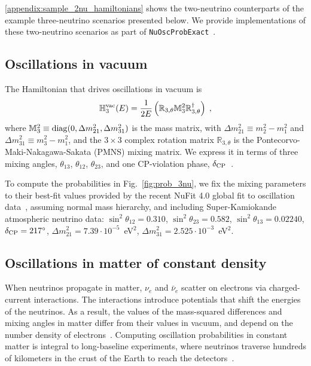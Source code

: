 \documentclass[final,5p,times,twocolumn]{elsarticle}
\newcommand{\fig}{Fig.}
\newcommand{\figu}[1]{\fig~\ref{fig:#1}}
\begin{document}
\ref{appendix:sample_2nu_hamiltonians} shows the two-neutrino counterparts of the example three-neutrino scenarios presented below.  We provide implementations of these two-neutrino scenarios as part of {\tt NuOscProbExact}\ \cite{NuOscProbExact}.  


\subsection{Oscillations in vacuum}

The Hamiltonian that drives oscillations in vacuum is
\begin{equation}
 \label{equ:h3_vacuum}
 \mathbb{H}_3^{\rm vac}(E)
 = 
 \frac{1}{2E} \left( \mathbb{R}_{3,\theta} \mathbb{M}_3^2 \mathbb{R}_{3,\theta}^\dagger \right) \;,
\end{equation}
where $\mathbb{M}_3^2 \equiv {\rm diag}(0, \Delta m_{21}^2, \Delta m_{31}^2)$ is the mass matrix, with $\Delta m_{21}^2 \equiv m_2^2-m_1^2$ and $\Delta m_{31}^2 \equiv m_3^2-m_1^2$, and the $3 \times 3$ complex rotation matrix $\mathbb{R}_{3,\theta}$ is the Pontecorvo-Maki-Nakagawa-Sakata (PMNS) mixing matrix.  We express it in terms of three mixing angles, $\theta_{13}$, $\theta_{12}$, $\theta_{23}$, and one CP-violation phase, $\delta_{\rm CP}$\ \cite{Tanabashi:2018oca}.  

To compute the probabilities in \figu{prob_3nu}, we fix the mixing parameters to their best-fit values provided by the recent NuFit 4.0 global fit to oscillation data\ \cite{Esteban:2018azc, NuFit4.0}, assuming normal mass hierarchy, and including Super-Kamiokande atmospheric neutrino data: $\sin^2 \theta_{12} = 0.310$, $\sin^2 \theta_{23} = 0.582$, $\sin^2 \theta_{13} = 0.02240$, $\delta_{\rm CP} = 217^\circ$, $\Delta m_{21}^2 = 7.39 \cdot 10^{-5}$~eV$^2$, $\Delta m_{31}^2 = 2.525 \cdot 10^{-3}$~eV$^2$.


\subsection{Oscillations in matter of constant density}
\label{section:prob_3nu_matter}

When neutrinos propagate in matter, $\nu_e$ and $\bar{\nu}_e$ scatter on electrons via charged-current interactions.  The interactions introduce potentials that shift the energies of the neutrinos.  As a result, the values of the mass-squared differences and mixing angles in matter differ from their values in vacuum, and depend on the number density of electrons\ \cite{Wolfenstein:1977ue, Mikheev:1986gs, Bethe:1986ej, Parke:1986jy, Rosen:1986jy}.  Computing oscillation probabilities in constant matter is integral to long-baseline experiments, where neutrinos traverse hundreds of kilometers in the crust of the Earth to reach the detectors\ \cite{Feldman:2013vca, Diwan:2016gmz}.
\end{document}
